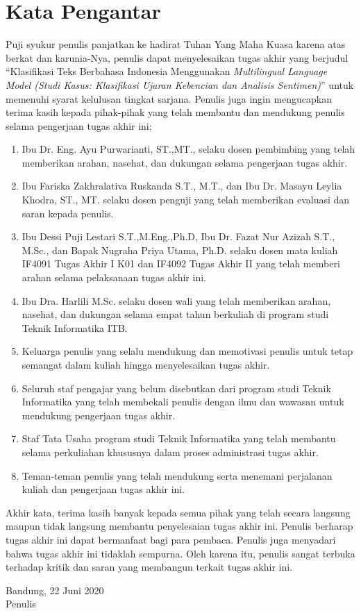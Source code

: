 \chapter*{Kata Pengantar}

Puji syukur penulis panjatkan ke hadirat Tuhan Yang Maha Kuasa karena atas berkat dan karunia-Nya, penulis dapat menyelesaikan tugas akhir yang berjudul “Klasifikasi Teks Berbahasa Indonesia Menggunakan \textit{Multilingual Language Model (Studi Kasus: Klasifikasi Ujaran Kebencian dan Analisis Sentimen)}” untuk memenuhi syarat kelulusan tingkat sarjana. Penulis juga ingin mengucapkan terima kasih kepada pihak-pihak yang telah membantu dan mendukung penulis selama pengerjaan tugas akhir ini:

\begin{enumerate}
    \item Ibu Dr. Eng. Ayu Purwarianti, ST.,MT., selaku dosen pembimbing yang telah memberikan arahan, nasehat, dan dukungan selama pengerjaan tugas akhir.
    \item Ibu Fariska Zakhralativa Ruskanda S.T., M.T., dan Ibu Dr. Masayu Leylia Khodra, ST., MT. selaku dosen penguji yang telah memberikan evaluasi dan saran kepada penulis.
    \item Ibu Dessi Puji Lestari S.T.,M.Eng.,Ph.D, Ibu Dr. Fazat Nur Azizah S.T., M.Sc., dan Bapak Nugraha Priya Utama, Ph.D. selaku dosen mata kuliah IF4091 Tugas Akhir I K01 dan IF4092 Tugas Akhir II yang telah memberi arahan selama pelaksanaan tugas akhir ini.
    \item Ibu Dra. Harlili M.Sc. selaku dosen wali yang telah memberikan arahan, nasehat, dan dukungan selama empat tahun berkuliah di program studi Teknik Informatika ITB.
    \item Keluarga penulis yang selalu mendukung dan memotivasi penulis untuk tetap semangat dalam kuliah hingga menyelesaikan tugas akhir.
    \item Seluruh staf pengajar yang belum disebutkan dari program studi Teknik Informatika yang telah membekali penulis dengan ilmu dan wawasan untuk mendukung pengerjaan tugas akhir.
    \item Staf Tata Usaha program studi Teknik Informatika yang telah membantu selama perkuliahan khususnya dalam proses administrasi tugas akhir.
    \item Teman-teman penulis yang telah mendukung serta menemani perjalanan kuliah dan pengerjaan tugas akhir ini.

    
\end{enumerate}
Akhir kata, terima kasih banyak kepada semua pihak yang telah secara langsung maupun tidak langsung membantu penyelesaian tugas akhir ini. Penulis berharap tugas akhir ini dapat bermanfaat bagi para pembaca. Penulis juga menyadari bahwa tugas akhir ini tidaklah sempurna. Oleh karena itu, penulis sangat terbuka terhadap kritik dan saran yang membangun terkait tugas akhir ini.

\begin{flushright} 
    Bandung, 22 Juni 2020 \\
    Penulis
\end{flushright}
\clearpage
